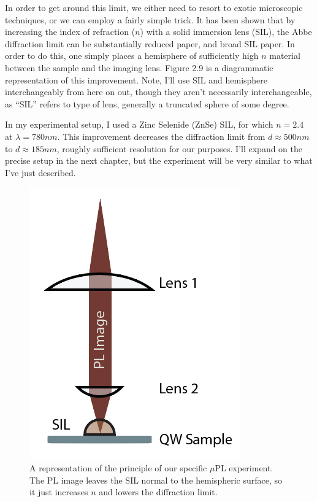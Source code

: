 \indent In order to get around this limit, we either need to resort to exotic microscopic techniques, or we can employ a fairly simple trick. It has been shown that by increasing the index of refraction ($n$) with a solid immersion lens (SIL), the Abbe diffraction limit can be substantially reduced  \cite{yoshitaapp} paper, and broad SIL paper. In order to do this, one simply places a hemisphere of sufficiently high $n$ material between the sample and the imaging lens. Figure 2.9 is a diagrammatic representation of this improvement. Note, I'll use SIL and hemisphere interchangeably from here on out, though they aren't necessarily interchangeable, as ``SIL'' refers to type of lens, generally a truncated sphere of some degree. 

\indent In my experimental setup, I used a Zinc Selenide (ZnSe) SIL, for which $n = 2.4$ at $\lambda = 780 nm$. This improvement decreases the diffraction limit from $d \approx 500nm$ to $ d \approx 185 nm$, roughly sufficient resolution for our purposes. I'll expand on the precise setup in the next chapter, but the experiment will be very similar to what I've just described.
\begin{figure}[h!]
\label{confocal2}
\centering
\includegraphics[width = .3\textwidth]{confocal2.png}
\caption{\doublespacing A representation of the principle of our specific $\mu$PL experiment. The PL image leaves the SIL normal to the hemispheric surface, so it just increases $n$ and lowers the diffraction limit.}
\end{figure}


